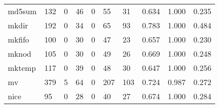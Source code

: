 \begin{longtable}{lp{1.3cm}p{1.3cm}p{1.3cm}p{1.3cm}p{1.3cm}p{1.3cm}p{1.3cm}p{1.3cm}p{1.3cm}}
md5sum    &                    132 &                                  0 &                                46 &                                0 &                                55 &                              31 &                                0.634 &                                  1.000 &                                0.235 \\
mkdir     &                    192 &                                  0 &                                34 &                                0 &                                65 &                              93 &                                0.783 &                                  1.000 &                                0.484 \\
mkfifo    &                    100 &                                  0 &                                30 &                                0 &                                47 &                              23 &                                0.657 &                                  1.000 &                                0.230 \\
mknod     &                    105 &                                  0 &                                30 &                                0 &                                49 &                              26 &                                0.669 &                                  1.000 &                                0.248 \\
mktemp    &                    117 &                                  0 &                                39 &                                0 &                                48 &                              30 &                                0.647 &                                  1.000 &                                0.256 \\
mv        &                    379 &                                  5 &                                64 &                                0 &                               207 &                             103 &                                0.724 &                                  0.987 &                                0.272 \\
nice      &                     95 &                                  0 &                                28 &                                0 &                                40 &                              27 &                                0.674 &                                  1.000 &                                0.284 \\

\end{longtable}
